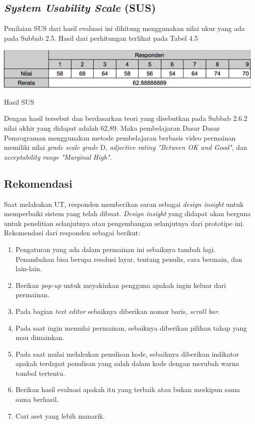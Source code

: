 	\subsection{\textit{System Usability Scale} (SUS)}
	Penilaian SUS dari hasil evaluasi ini dihitung menggunakan nilai ukur yang ada pada Subbab 2.5. Hasil dari perhitungan terlihat pada Tabel 4.5
	\begin{table}
		\includegraphics[width=\linewidth]{pics/hasil-sus}
		\caption{Hasil SUS}
		\centering
	\end{table}
	Dengan hasil tersebut dan berdasarkan teori yang disebutkan pada Subbab 2.6.2 nilai akhir yang didapat adalah 62,89. Maka pembelajaran Dasar Dasar Pemrograman menggunakan metode pembelajaran berbasis video permainan memiliki nilai \textit{grade scale grade} D, \textit{adjective rating "Between OK and Good"}, dan \textit{acceptability range "Marginal High"}.
	
	\subsection{Rekomendasi}
	Saat melakukan UT, responden memberikan saran sebagai \textit{design insight} untuk memperbaiki sistem yang telah dibuat. \textit{Design insight} yang didapat akan berguna untuk penelitian selanjutnya atau pengembangan selanjutnya dari prototipe ini. Rekomendasi dari responden sebagai berikut:
	\begin{enumerate}
		\item Pengaturan yang ada dalam permainan ini sebaiknya tambah lagi. Penambahan bisa berupa resolusi layar, tentang penulis, cara bermain, dan lain-lain.
		\item Berikan \textit{pop-up} untuk meyakinkan pengguna apakah ingin keluar dari permainan.
		\item Pada bagian \textit{text editor} sebaiknya diberikan nomor baris, \textit{scroll bar}.
		\item Pada saat ingin memulai permainan, sebaiknya diberikan pilihan tahap yang mau dimainkan.
		\item Pada saat mulai melakukan penulisan kode, sebaiknya diberikan indikator apakah terdapat penulisan yang salah dalam kode dengan merubah warna tombol tertentu.
		\item Berikan hasil evaluasi apakah itu yang terbaik atau bukan meskipun sama sama berhasil.
		\item Cari aset yang lebih manarik.
	\end{enumerate}
	